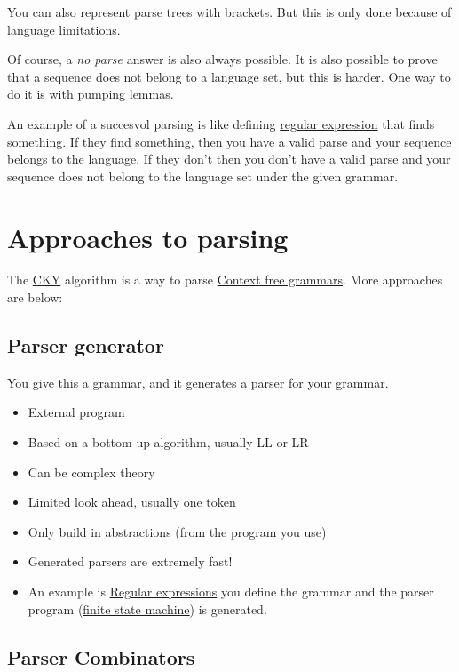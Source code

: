 \documentclass[
  11pt,
  british,
]{article}
\providecommand{\tightlist}{%
  \setlength{\itemsep}{0pt}\setlength{\parskip}{0pt}}
\begin{document}
You can also represent parse trees with brackets. But this is only done
because of language limitations.

Of course, a \emph{no parse} answer is also always possible. It is also
possible to prove that a sequence does not belong to a language set, but
this is harder. One way to do it is with pumping lemmas.

An example of a succesvol parsing is like defining
\href{Regular\%20expression.md}{regular expression} that finds
something. If they find something, then you have a valid parse and your
sequence belongs to the language. If they don't then you don't have a
valid parse and your sequence does not belong to the language set under
the given grammar.

\hypertarget{approaches-to-parsing}{%
\section{Approaches to parsing}\label{approaches-to-parsing}}

The \href{CKY.md}{CKY} algorithm is a way to parse
\href{Context\%20free\%20grammars.md}{Context free grammars}. More
approaches are below:

\hypertarget{parser-generator}{%
\subsection{Parser generator}\label{parser-generator}}

You give this a grammar, and it generates a parser for your grammar.

\begin{itemize}
\tightlist
\item
  External program
\item
  Based on a bottom up algorithm, usually LL or LR
\item
  Can be complex theory
\item
  Limited look ahead, usually one token
\item
  Only build in abstractions (from the program you use)
\item
  Generated parsers are extremely fast!
\item
  An example is \href{Regular\%20expression.md}{Regular expressions} you
  define the grammar and the parser program
  (\href{finite\%20state\%20automata.md}{finite state machine}) is
  generated.
\end{itemize}

\hypertarget{parser-combinators}{%
\subsection{Parser Combinators}\label{parser-combinators}}
\end{document}
